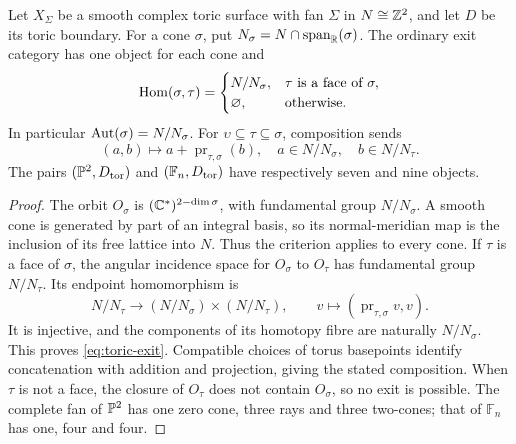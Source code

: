 \begin{proposition}\label{P1e4}
Let $X_\Sigma$ be a smooth complex toric surface with fan $\Sigma$ in
$N\cong\mathbb Z^2$, and let $D$ be its toric boundary. For a cone $\sigma$,
put $N_\sigma=N\cap\operatorname{span}_{\mathbb R}(\sigma)$.
The ordinary exit category has one object for each cone and
\begin{equation}\label{eq:toric-exit}
 \operatorname{Hom}(\sigma,\tau)=
 \begin{cases}
 N/N_\sigma,&\tau\text{ is a face of }\sigma,\\
 \varnothing,&\text{otherwise}.
 \end{cases}
\end{equation}
In particular $\operatorname{Aut}(\sigma)=N/N_\sigma$. For
$\upsilon\subseteq\tau\subseteq\sigma$, composition sends
\[
 (a,b)\longmapsto a+\operatorname{pr}_{\tau,\sigma}(b),
 \quad a\in N/N_\sigma,\quad b\in N/N_\tau.
\]
The pairs $(\mathbb P^2,D_{\rm tor})$ and
$(\mathbb F_n,D_{\rm tor})$ have respectively seven and nine objects.
\end{proposition}
\begin{proof}
The orbit $O_\sigma$ is $(\mathbb C^*)^{2-\dim\sigma}$, with fundamental group
$N/N_\sigma$. A smooth cone is generated by part of an integral basis,
so its normal-meridian map is the inclusion of its free lattice into
$N$. Thus the criterion applies to every cone. If $\tau$ is a face of
$\sigma$, the angular incidence space for $O_\sigma$ to $O_\tau$ has
fundamental group $N/N_\tau$. Its endpoint homomorphism is
\[
 N/N_\tau\longrightarrow (N/N_\sigma)\times(N/N_\tau),
 \qquad v\longmapsto(\operatorname{pr}_{\tau,\sigma}v,v).
\]
It is injective, and the components of its homotopy fibre are naturally
$N/N_\sigma$. This proves \eqref{eq:toric-exit}. Compatible choices of
torus basepoints identify concatenation with addition and projection,
giving the stated composition. When $\tau$ is not a face, the closure
of $O_\tau$ does not contain $O_\sigma$, so no exit is possible.
The complete fan of $\mathbb P^2$ has one zero cone, three rays and three
two-cones; that of $\mathbb F_n$ has one, four and four.
\end{proof}

